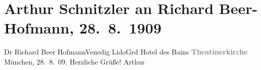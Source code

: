 

         
         \newcommand{\erwaehntePersonen}{Personen: Richard Beer-Hofmann}
         \newcommand{\erwaehnteInstitutionen}{}
         \newcommand{\erwaehnteOrte}{Orte: Grand Hotel des Bains, Lido, München, Santa Maria Elisabetta, Theatinerkirche}
         \newcommand{\erwaehnteWerke}{Werke: Theatinerkirche}
               \section[Arthur Schnitzler an Richard Beer-Hofmann, 28. 8. 1909]{ Arthur Schnitzler an Richard Beer-Hofmann, 28. 8. 1909}\nopagebreak{}\rehead{ }\begin{ledgroupsized}[t]{13cm}\normalsize\beginnumbering \toendnotes[C]{\smallbreak\pagebreak[2]} 
\pstart{}{\pb}Dr Richard Beer Hofmann\pend{}\pstart{}Venedig Lido\pend{}\pstart{}Grd Hotel des Bains\pend{}{\bigskip}\pstart
           \noindent{}\centering{}{\pb}\textcolor{gray}{\textbf{Theatinerkirche}}\pend
           \pstart
           \centering{}{\pb}München, 28. 8. 09.\pend
           \pstart
           Herzliche Grüße!\pend
           \pstart \spacefill\mbox{Arthur}\pend{}
         
         \endnumbering{}\end{ledgroupsized}  \newcommand{\dateiname}{L01870}\newcommand{\titel}{Arthur Schnitzler an Richard Beer-Hofmann, 28. 8. 1909}\newcommand{\editorInnen}{Martin Anton Müller und Gerd-Hermann Susen}
      